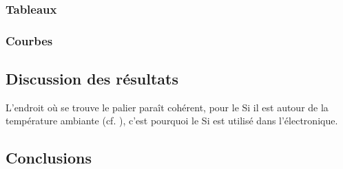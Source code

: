\subsubsection{Tableaux}

\subsubsection{Courbes}


\subsection{Discussion des résultats}

L'endroit où se trouve le palier paraît cohérent, pour le Si il est autour de la température ambiante (cf. \cite{kittel_introduction_1976}), 
c'est pourquoi le Si est utilisé dans l'électronique.




\subsection{Conclusions}

